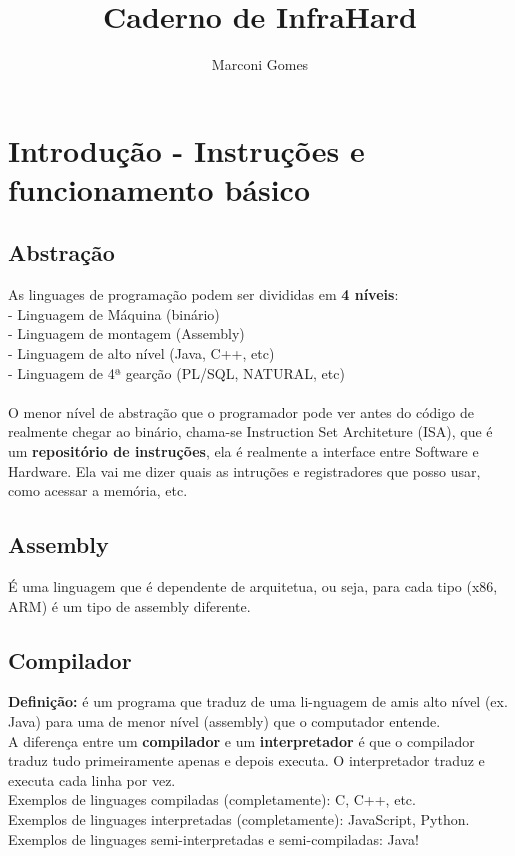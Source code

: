 \documentclass[12pt]{article}
\begin{document}
\nocite{*}

\title{Caderno de InfraHard}
\author{Marconi Gomes}

\maketitle


\section{Introdução - Instruções e funcionamento básico}
    \subsection{Abstração}
    As linguages de programação podem ser divididas em \textbf{4 níveis}:
    \\- Linguagem de Máquina (binário)
    \\- Linguagem de montagem (Assembly)
    \\- Linguagem de alto nível (Java, C++, etc)
    \\- Linguagem de 4ª gearção (PL/SQL, NATURAL, etc)
    \\~\\O menor nível de abstração que o programador pode ver antes do código de realmente chegar ao binário, chama-se Instruction Set Architeture (ISA), que é um \textbf{repositório de instruções}, ela é realmente a interface entre Software e Hardware. Ela vai me dizer quais as intruções e registradores que posso usar, como acessar a memória, etc.

    \subsection{Assembly}
    É uma linguagem que é dependente de arquitetua, ou seja, para cada tipo (x86, ARM) é um tipo de assembly diferente.

    \subsection{Compilador}
    \textbf{Definição:} é um programa que traduz de uma li-nguagem de amis alto nível (ex. Java) para uma de menor nível (assembly) que o computador entende.
    \\A diferença entre um \textbf{compilador} e um \textbf{interpretador} é que o compilador traduz tudo primeiramente apenas e depois executa. O interpretador traduz e executa cada linha por vez. 
    \\Exemplos de linguages compiladas (completamente): C, C++, etc.
    \\Exemplos de linguages interpretadas (completamente): JavaScript, Python.
    \\Exemplos de linguages semi-interpretadas e semi-compiladas: Java!
\end{document}
